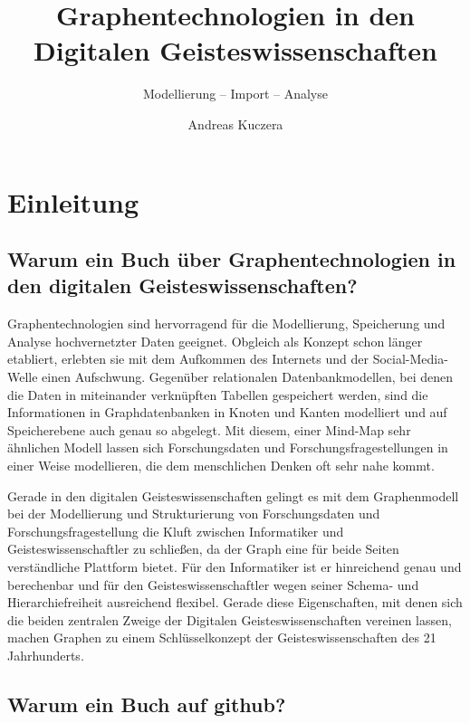 \documentclass[ngerman,]{scrreprt}
\title{Graphentechnologien in den Digitalen Geisteswissenschaften}
\subtitle{Modellierung -- Import -- Analyse}
\author{Andreas Kuczera}
\date{}
\begin{document}
\maketitle

{
\hypersetup{linkcolor=}
\setcounter{tocdepth}{2}
\tableofcontents
}
\hypertarget{einleitung}{%
\chapter{Einleitung}\label{einleitung}}

\hypertarget{warum-ein-buch-uxfcber-graphentechnologien-in-den-digitalen-geisteswissenschaften}{%
\section{Warum ein Buch über Graphentechnologien in den digitalen Geisteswissenschaften?}\label{warum-ein-buch-uxfcber-graphentechnologien-in-den-digitalen-geisteswissenschaften}}

Graphentechnologien sind hervorragend für die Modellierung, Speicherung und Analyse hochvernetzter Daten geeignet. Obgleich als Konzept schon länger etabliert, erlebten sie mit dem Aufkommen des Internets und der Social-Media-Welle einen Aufschwung. Gegenüber relationalen Datenbankmodellen, bei denen die Daten in miteinander verknüpften Tabellen gespeichert werden, sind die Informationen in Graphdatenbanken in Knoten und Kanten modelliert und auf Speicherebene auch genau so abgelegt. Mit diesem, einer Mind-Map sehr ähnlichen Modell lassen sich Forschungsdaten und Forschungsfragestellungen in einer Weise modellieren, die dem menschlichen Denken oft sehr nahe kommt.

Gerade in den digitalen Geisteswissenschaften gelingt es mit dem Graphenmodell bei der Modellierung und Strukturierung von Forschungsdaten und Forschungsfragestellung die Kluft zwischen Informatiker und Geisteswissenschaftler zu schließen, da der Graph eine für beide Seiten verständliche Plattform bietet. Für den Informatiker ist er hinreichend genau und berechenbar und für den Geisteswissenschaftler wegen seiner Schema- und Hierarchiefreiheit ausreichend flexibel. Gerade diese Eigenschaften, mit denen sich die beiden zentralen Zweige der Digitalen Geisteswissenschaften vereinen lassen, machen Graphen zu einem Schlüsselkonzept der Geisteswissenschaften des 21 Jahrhunderts.

\hypertarget{warum-ein-buch-auf-github}{%
\section{Warum ein Buch auf github?}\label{warum-ein-buch-auf-github}}
\end{document}
